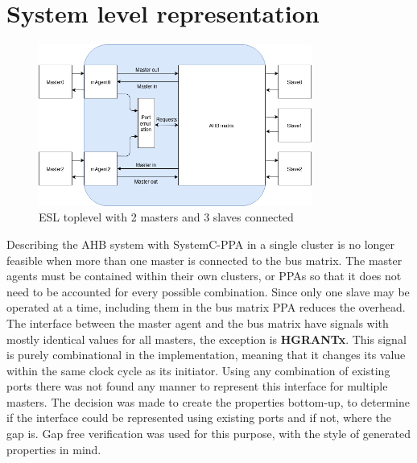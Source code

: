 \section{System level representation}
\label{sec:syslev}
\begin{figure}[hbt]
    \begin{center}
        \includegraphics[width=0.8\textwidth]{figs/ESL/Syslev.png}
    \end{center}
    \caption{ESL toplevel with 2 masters and 3 slaves connected}
    \label{fig:esl_toplev}
\end{figure}

Describing the AHB system with SystemC-PPA in a single cluster is no longer feasible when more than one master is connected to the bus matrix. The master agents must be contained within their own clusters, or PPAs so that it does not need to be accounted for every possible combination. Since only one slave may be operated at a time, including them in the bus matrix PPA reduces the overhead. The interface between the master agent and the bus matrix have signals with mostly identical values for all masters, the exception is \textbf{HGRANTx}. This signal is purely combinational in the implementation, meaning that it changes its value within the same clock cycle as its initiator. Using any combination of existing ports there was not found any manner to represent this interface for multiple masters. The decision was made to create the properties bottom-up, to determine if the interface could be represented using existing ports and if not, where the gap is. Gap free verification was used for this purpose, with the style of generated properties in mind. 

